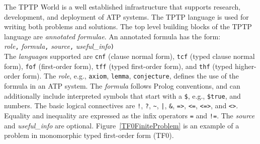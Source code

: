\documentclass[letterpaper]{article}
\newcommand{\smalltt}[1]{\small \texttt{#1}}
\begin{document}
The TPTP World \cite{Sut17} is a well established infrastructure that supports research, 
development, and deployment of ATP systems.
The TPTP language \cite{Sut22-IGPL} is 
used for writing both problems and solutions.
The top level building blocks of the TPTP language are {\em annotated formulae}.
An annotated formula has the form:\\
{\em role}{\tt ,}
{\em formula}{\tt ,}
{\em source}{\tt ,}
{\em useful\_info}{\tt )}\\
The {\em language}s supported are {\smalltt{cnf}} (clause normal form), {\smalltt{tcf}} (typed
clause normal form), {\smalltt{fof}} (first-order form), {\smalltt{tff}} (typed first-order form), 
and {\smalltt{thf}} (typed higher-order form).
The {\em role}, e.g., {\smalltt{axiom}}, {\smalltt{lemma}}, {\smalltt{conjecture}},
defines the use of the formula in an ATP system.
The {\em formula} follows Prolog conventions, and can
additionally include interpreted symbols that start with a {\tt \$}, e.g., {\smalltt{\$true}},
and numbers.
The basic logical connectives are
{\tt !}, {\tt ?}, {\tt \verb|~|}, {\tt |}, {\tt \&}, {\tt =>}, {\tt <=}, {\tt <=>}, and 
{\tt <{\raisebox{0.4ex}{\texttildelow}}>}.
Equality and inequality are expressed as the infix operators {\tt =} and {\tt !=}.
The {\em source} and {\em useful\_info} are optional.
Figure~\ref{TF0FiniteProblem} is an example of a problem in monomorphic typed first-order
form (TF0).  
\end{document}
